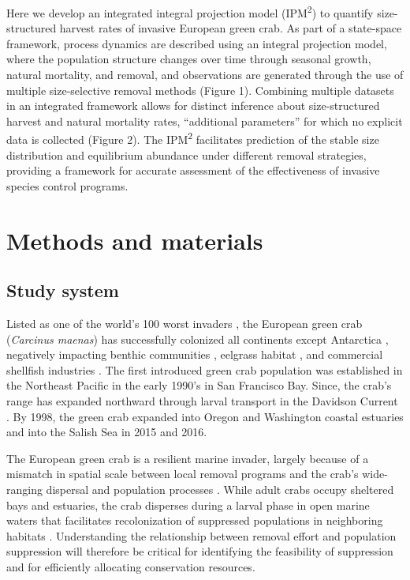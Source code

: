 \documentclass{article}
\begin{document}
Here we develop an integrated integral projection model (IPM\textsuperscript{2}) to quantify size-structured harvest rates of invasive European green crab. As part of a state-space framework, process dynamics are described using an integral projection model, where the population structure changes over time through seasonal growth, natural mortality, and removal, and observations are generated through the use of multiple size-selective removal methods (Figure 1). Combining multiple datasets in an integrated framework allows for distinct inference about size-structured harvest and natural mortality rates, “additional parameters” for which no explicit data is collected (Figure 2). The IPM\textsuperscript{2} facilitates prediction of the stable size distribution and equilibrium abundance under different removal strategies, providing a framework for accurate assessment of the effectiveness of invasive species control programs.

\section{Methods and materials}

\subsection{Study system}

Listed as one of the world’s 100 worst invaders \parencite{lowe2000100}, the European green crab (\textit{Carcinus maenas}) has successfully colonized all continents except Antarctica \parencite{yamada2001global}, negatively impacting benthic communities \parencite{grosholz2005recent}, eelgrass habitat \parencite{garbary2014drastic, howard2019habitat}, and commercial shellfish industries \parencite{grosholz2011modeling}. The first introduced green crab population was established in the Northeast Pacific in the early 1990's in San Francisco Bay. Since, the crab's range has expanded northward through larval transport in the Davidson Current \parencite{yamada2021ocean}. By 1998, the green crab expanded into Oregon and Washington coastal estuaries and into the Salish Sea in 2015 and 2016. 

The European green crab is a resilient marine invader, largely because of a mismatch in spatial scale between local removal programs and the crab’s wide-ranging dispersal and population processes \parencite{keller2025transition}. While adult crabs occupy sheltered bays and estuaries, the crab disperses during a larval phase in open marine waters that facilitates recolonization of suppressed populations in neighboring habitats \parencite{yamada2021ocean}. Understanding the relationship between removal effort and population suppression will therefore be critical for identifying the feasibility of suppression and for efficiently allocating conservation resources. 
\end{document}
